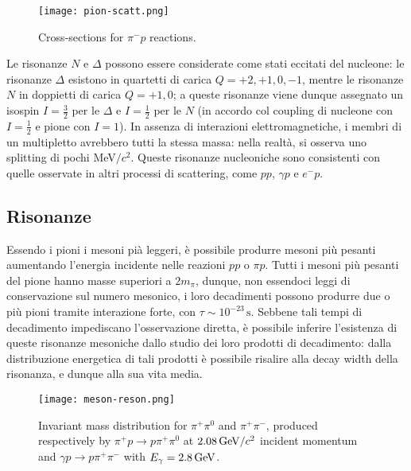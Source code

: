 \begin{figure}[!hb]
	\centering
	\texttt{[image: pion-scatt.png]}
	\caption{Cross-sections for $ \pi^- p $ reactions.}
	\label{pion-scatt}
\end{figure}

Le risonanze $ N $ e $ \Delta $ possono essere considerate come stati eccitati del nucleone: le risonanze $ \Delta $ esistono in quartetti di carica $ Q = +2,+1,0,-1 $, mentre le risonanze $ N $ in doppietti di carica $ Q = +1,0 $; a queste risonanze viene dunque assegnato un isospin $ I = \frac{3}{2} $ per le $ \Delta $ e $ I = \frac{1}{2} $ per le $ N $ (in accordo col coupling di nucleone con $ I = \frac{1}{2} $ e pione con $ I = 1 $). In assenza di interazioni elettromagnetiche, i membri di un multipletto avrebbero tutti la stessa massa: nella realtà, si osserva uno splitting di pochi MeV$ /c^2 $. Queste risonanze nucleoniche sono consistenti con quelle osservate in altri processi di scattering, come $ pp $, $ \gamma p $ e $ e^- p $.

\subsection{Risonanze}

Essendo i pioni i mesoni pià leggeri, è possibile produrre mesoni più pesanti aumentando l'energia incidente nelle reazioni $ pp $ o $ \pi p $. Tutti i mesoni più pesanti del pione hanno masse superiori a $ 2m_{\pi} $, dunque, non essendoci leggi di conservazione sul numero mesonico, i loro decadimenti possono produrre due o più pioni tramite interazione forte, con $ \tau \sim 10^{-23}\,\text{s} $. Sebbene tali tempi di decadimento impediscano l'osservazione diretta, è possibile inferire l'esistenza di queste risonanze mesoniche dallo studio dei loro prodotti di decadimento: dalla distribuzione energetica di tali prodotti è possibile risalire alla decay width della risonanza, e dunque alla sua vita media.

\begin{figure}[!h]
	\centering
	\texttt{[image: meson-reson.png]}
	\caption{Invariant mass distribution for $ \pi^+ \pi^0 $ and $ \pi^+ \pi^- $, produced respectively by $ \pi^+ p \rightarrow p \pi^+ \pi^0 $ at $ 2.08\,\mathrm{GeV}/c^2 $ incident momentum and $ \gamma p \rightarrow p \pi^+ \pi^- $ with $ E_{\gamma} = 2.8\,\mathrm{GeV} $.}
	\label{meson-reson}
\end{figure}

